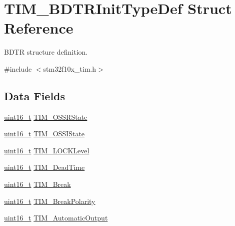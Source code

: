 \hypertarget{struct_t_i_m___b_d_t_r_init_type_def}{\section{T\-I\-M\-\_\-\-B\-D\-T\-R\-Init\-Type\-Def Struct Reference}
\label{struct_t_i_m___b_d_t_r_init_type_def}
}


B\-D\-T\-R structure definition.  




{\ttfamily \#include $<$stm32f10x\-\_\-tim.\-h$>$}

\subsection*{Data Fields}
\begin{DoxyCompactItemize}
\item 
\hyperlink{stdint_8h_a273cf69d639a59973b6019625df33e30}{uint16\-\_\-t} \hyperlink{struct_t_i_m___b_d_t_r_init_type_def_a8f34ad7bc4764bd3ff372cadde468072}{T\-I\-M\-\_\-\-O\-S\-S\-R\-State}
\item 
\hyperlink{stdint_8h_a273cf69d639a59973b6019625df33e30}{uint16\-\_\-t} \hyperlink{struct_t_i_m___b_d_t_r_init_type_def_ad8891e3739a7db8a45343d4e2f9d2824}{T\-I\-M\-\_\-\-O\-S\-S\-I\-State}
\item 
\hyperlink{stdint_8h_a273cf69d639a59973b6019625df33e30}{uint16\-\_\-t} \hyperlink{struct_t_i_m___b_d_t_r_init_type_def_aa5296a7b194d25b16899f6a98da01f03}{T\-I\-M\-\_\-\-L\-O\-C\-K\-Level}
\item 
\hyperlink{stdint_8h_a273cf69d639a59973b6019625df33e30}{uint16\-\_\-t} \hyperlink{struct_t_i_m___b_d_t_r_init_type_def_a01ccbaffccdb3068b8a60c912579b1a2}{T\-I\-M\-\_\-\-Dead\-Time}
\item 
\hyperlink{stdint_8h_a273cf69d639a59973b6019625df33e30}{uint16\-\_\-t} \hyperlink{struct_t_i_m___b_d_t_r_init_type_def_a9fcf20632d0377727476a98f7183be56}{T\-I\-M\-\_\-\-Break}
\item 
\hyperlink{stdint_8h_a273cf69d639a59973b6019625df33e30}{uint16\-\_\-t} \hyperlink{struct_t_i_m___b_d_t_r_init_type_def_a5731e4e786b66f35cfe4798d6157619e}{T\-I\-M\-\_\-\-Break\-Polarity}
\item 
\hyperlink{stdint_8h_a273cf69d639a59973b6019625df33e30}{uint16\-\_\-t} \hyperlink{struct_t_i_m___b_d_t_r_init_type_def_a6c056e29af67fd8a32919104ea48eea2}{T\-I\-M\-\_\-\-Automatic\-Output}
\end{DoxyCompactItemize}


